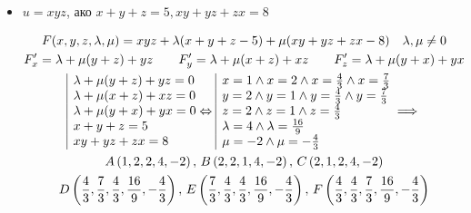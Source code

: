 \documentclass[a4paper,fleqn,12pt]{article}
\theoremstyle{definition}
\begin{document}
\begin{itemize}
\item $u = xyz$, ако $x + y + z = 5, xy+yz+zx = 8$ 

\begin{gather*}
F(x,y,z,\lambda, \mu)= xyz +\lambda(x+y+z - 5) + \mu(xy+yz+zx - 8)  \quad \lambda,\mu \neq 0\\
F'_x = \lambda + \mu(y+z) + yz \qquad F'_y = \lambda + \mu(x+z) + xz \qquad F'_z = \lambda + \mu(y+x) + yx\\
\begin{array}{|l@{}}
\lambda + \mu(y+z) + yz = 0\\
\lambda + \mu(x+z) + xz = 0\\
\lambda + \mu(y+x) + yx = 0\\
x + y + z = 5\\
xy+yz+zx = 8
\end{array}\Leftrightarrow 
\begin{array}{|l@{}}
x = 1 \land x = 2 \land x = \frac{4}{3} \land x = \frac{7}{3} \\
y = 2 \land y = 1 \land y = \frac{4}{3} \land y = \frac{7}{3} \\
z = 2 \land z = 1 \land z = \frac{4}{3}\\
\lambda = 4  \land \lambda = \frac{16}{9} \\
\mu = -2 \land \mu = -\frac{4}{3}
\end{array} \implies \\
A \left(1,2,2,4,-2 \right), \, 
B \left(2,2,1,4,-2 \right), \,
C \left(2,1,2,4,-2 \right) \\
D \left(\frac{4}{3},\frac{7}{3},\frac{4}{3},\frac{16}{9},-\frac{4}{3} \right), \,
E \left(\frac{7}{3},\frac{4}{3},\frac{4}{3},\frac{16}{9},-\frac{4}{3} \right), \,
F \left(\frac{4}{3},\frac{4}{3},\frac{7}{3},\frac{16}{9},-\frac{4}{3} \right) \\
\end{gather*}


\end{itemize}
\end{document}
